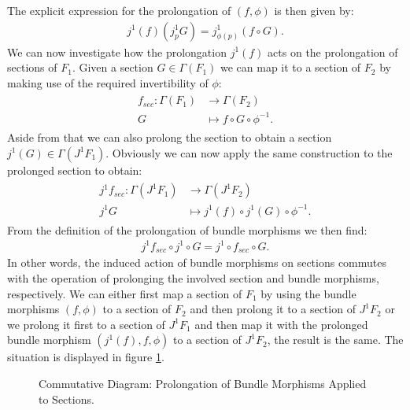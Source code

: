 The explicit expression for the prolongation of $(f,\phi)$ is then given by:
\begin{align}
    j^1(f)(j^1_pG) = j^1_{\phi(p)}(f\circ G).
\end{align}
We can now investigate how the prolongation $j^1(f)$ acts on the prolongation of sections of $F_1$.
Given a section $G \in \Gamma(F_1)$ we can map it to a section of $F_2$ by making use of the required invertibility of $\phi$: 
\begin{align}
\begin{aligned}
f_{sec} : \Gamma(F_1) &\longrightarrow \Gamma(F_2) \\
G & \longmapsto f \circ G \circ \phi^{-1}.
\end{aligned}
\end{align}
Aside from that we can also prolong the section to obtain a section $j^1(G) \in \Gamma(J^1F_1)$. Obviously we can now apply the same construction to the prolonged section to obtain:
\begin{align}
\begin{aligned}
j^1f_{sec}: \Gamma(J^1F_1) &\longrightarrow \Gamma(J^1F_2) \\
j^1G & \longmapsto  j^1(f) \circ j^1(G) \circ \phi^{-1}.
\end{aligned}
\end{align}
From the definition of the prolongation of bundle morphisms we then find:
\begin{align}
    j^1f_{sec} \circ j^1 \circ G = j^1 \circ f_{sec} \circ G.
\end{align}
In other words, the induced action of bundle morphisms on sections commutes with the operation of prolonging the involved section and bundle morphisms, respectively. We can either first map a section of $F_1$ by using the bundle morphisms $(f,\phi)$ to a section of $F_2$ and then prolong it to a section of $J^1F_2$ or we prolong it first to a section of $J^1F_1$ and then map it with the prolonged bundle morphism $(j^1(f),f,\phi)$ to a section of $J^1F_2$, the result is the same. The situation is displayed in figure \ref{BundleMorphSec}. 

\begin{figure}[hbt!]
\centering 
{}
\caption{Commutative Diagram: Prolongation of Bundle Morphisms Applied to Sections.}\label{BundleMorphSec}
\end{figure}

